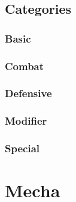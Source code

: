 \documentclass[twoside]{book}
\begin{document}
\section{Categories}
    
    

\subsection{Basic}
    
    

\subsection{Combat}
    
    

\subsection{Defensive}
    
    

\subsection{Modifier}
    
    

\subsection{Special}
    
    

\chapter{Mecha}
    
    
\end{document}
